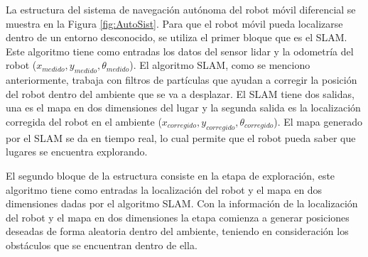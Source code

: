 La estructura del sistema de navegación autónoma del robot móvil diferencial se muestra en la
Figura \ref{fig:AutoSist}. Para que el robot móvil pueda localizarse dentro de un entorno 
desconocido, se utiliza el primer bloque que es el SLAM. Este algoritmo tiene como entradas 
los datos del sensor lidar y la odometría del robot ($x_{medido}, y_{medido}, \theta_{medido}$). El
algoritmo SLAM, como se menciono anteriormente, trabaja con filtros de partículas que ayudan 
a corregir la posición del robot dentro del ambiente que se va a desplazar. El SLAM tiene 
dos salidas, una es el mapa en dos dimensiones del lugar y la segunda salida es la localización
corregida del robot en el ambiente ($x_{corregido}, y_{corregido}, \theta_{corregido}$). El mapa
generado por el SLAM se da en tiempo real, lo cual permite que el robot pueda saber que lugares se
encuentra explorando.


El segundo bloque de la estructura consiste en la etapa de exploración, este algoritmo tiene 
como entradas la localización del robot y el mapa en dos dimensiones dadas por el algoritmo
SLAM. Con la información de la localización del robot y el mapa en dos dimensiones la etapa 
comienza a generar posiciones deseadas de forma aleatoria dentro del ambiente, teniendo en 
consideración los obstáculos que se encuentran dentro de ella. 

